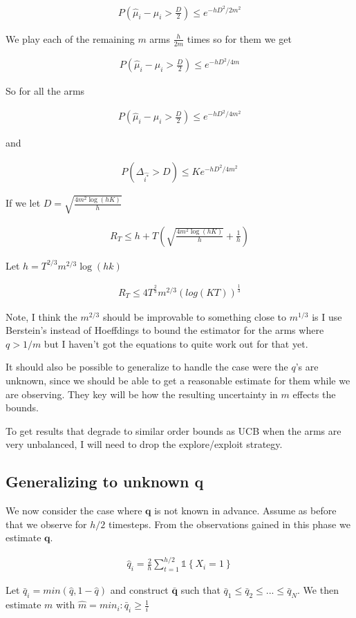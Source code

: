 \documentclass{article}
\newcommand{\set}[1]{\left\{#1\right\}}
\newcommand{\ind}[1]{\mathds{1}\!\!\set{#1}}
\newcommand{\eqn}[1]{\begin{align}#1\end{align}}
\theoremstyle{plain}
\theoremstyle{definition}
\begin{document}
\eqn{
P(\hat{\mu}_i - \mu_{i} > \frac{D}{2}) \leq e^{-hD^2/2m^2}
}

We play each of the remaining $m$ arms $\frac{h}{2m}$ times so for them we get

\eqn{
P(\hat{\mu}_i - \mu_{i} > \frac{D}{2}) \leq e^{-hD^2/4m}
}

So for all the arms 

\eqn{
P(\hat{\mu}_i - \mu_{i} > \frac{D}{2}) \leq e^{-hD^2/4m^2}
}

and 



\eqn{
\label{eqn:unbalancedHoeffdings}
P(\Delta_{\hat{i^*}} > D) \leq Ke^{-hD^2/4m^2}
}

If we let $D = \sqrt{\frac{4m^2\log(hK)}{h}}$

\eqn{
R_T  \leq h + T\left(\sqrt{\frac{4m^2\log(hK)}{h}} + \frac{1}{h}\right)
}

Let $h = T^{2/3}m^{2/3}\log(hk)$


\eqn {
R_T  \leq 4T^{\frac{2}{3}}m^{2/3}(log(KT))^{\frac{1}{3}}
}

Note, I think the $m^{2/3}$ should be improvable to something close to $m^{1/3}$ is I use Berstein's instead of Hoeffdings to bound the estimator for the arms where $q > 1/m$ but I haven't got the equations to quite work out for that yet. 

It should also be possible to generalize to handle the case were the $q$'s are unknown, since we should be able to get a reasonable estimate for them while we are observing. They key will be how the resulting uncertainty in $m$ effects the bounds. 

To get results that degrade to similar order bounds as UCB when the arms are very unbalanced, I will need to drop the explore/exploit strategy. 


\subsection{Generalizing to unknown q}
We now consider the case where $\boldsymbol{q}$ is not known in advance. Assume as before that we observe for $h/2$ timesteps. From the observations gained in this phase we estimate $\boldsymbol{q}$.

\eqn{
\hat{q}_i = \frac{2}{h}\sum_{t=1}^{h/2}\ind{X_i=1}
}

Let $\bar{q}_i = min(\hat{q},1-\hat{q})$ and construct $\bar{\boldsymbol{q}}$ such that $\bar{q}_1 \leq \bar{q}_2 \leq ...\leq \bar{q}_N$. We then estimate $m$ with $\hat{m} = min_i : \bar{q}_i \geq \frac{1}{i}$  
\end{document}
